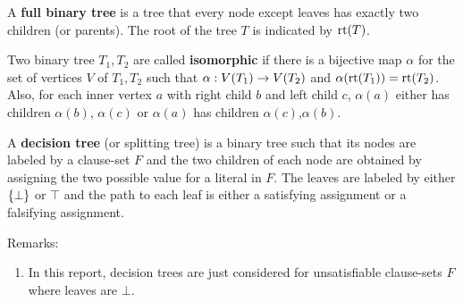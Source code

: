 \documentclass{report}
\begin{document}
A \textbf{full binary tree} is a tree that every node except leaves has exactly two children (or parents). The root of the tree $T$ is indicated by $\operatorname{rt}(T)$.

\begin{defi}\label{def:isomo-trees}
Two binary tree $T_1, T_2$ are called \textbf{isomorphic} if there is a bijective map $\alpha$ for the set of vertices $V$ of $T_1, T_2$ such that $\alpha: V(T_1) \rightarrow V(T_2)$ and $\alpha(\operatorname{rt}(T_1))=\operatorname{rt}(T_2)$. Also, for each inner vertex $a$ with right child $b$ and left child $c$, $\alpha(a)$ either has children $\alpha(b)$, $\alpha(c)$ or $\alpha(a)$ has children $\alpha(c)$,$\alpha(b)$.
\end{defi}

\begin{defi}\label{def:decs-tree}
A \textbf{decision tree} (or splitting tree) is a binary tree such that its nodes are labeled by a clause-set $F$ and the two children of each node are obtained by assigning the two possible value for a literal in $F$. The leaves are labeled by either $\{ \bot \}$ or $\top$ and the path to each leaf is either a satisfying assignment or a falsifying assignment.
\end{defi}
Remarks:
  \begin{enumerate}
  \item  In this report, decision trees are just considered for unsatisfiable clause-sets $F$ where leaves are $\bot$.
  \end{enumerate}
\end{document}
